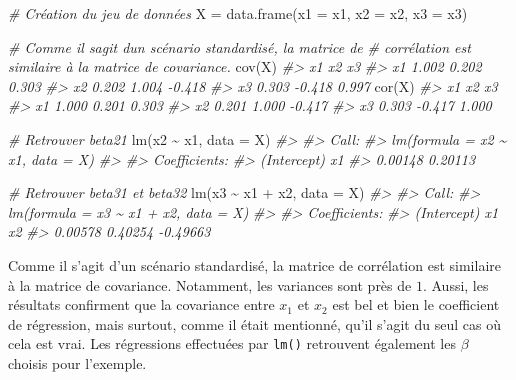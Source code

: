 \documentclass[
]{book}
\newenvironment{Shaded}{}{}
\newcommand{\AttributeTok}[1]{#1}
\newcommand{\CommentTok}[1]{\textit{#1}}
\newcommand{\FunctionTok}[1]{#1}
\newcommand{\NormalTok}[1]{#1}
\newcommand{\OtherTok}[1]{#1}
\newcommand{\SpecialCharTok}[1]{#1}
\begin{document}
\begin{Shaded}
\begin{Highlighting}[]
\CommentTok{\# Création du jeu de données}
\NormalTok{X }\OtherTok{=} \FunctionTok{data.frame}\NormalTok{(}\AttributeTok{x1 =}\NormalTok{ x1,}
               \AttributeTok{x2 =}\NormalTok{ x2,}
               \AttributeTok{x3 =}\NormalTok{ x3)}

\CommentTok{\# Comme il s\textquotesingle{}agit d\textquotesingle{}un scénario standardisé, la matrice de}
\CommentTok{\# corrélation est similaire à la matrice de covariance.}
\FunctionTok{cov}\NormalTok{(X)}
\CommentTok{\#\textgreater{}       x1     x2     x3}
\CommentTok{\#\textgreater{} x1 1.002  0.202  0.303}
\CommentTok{\#\textgreater{} x2 0.202  1.004 {-}0.418}
\CommentTok{\#\textgreater{} x3 0.303 {-}0.418  0.997}
\FunctionTok{cor}\NormalTok{(X)}
\CommentTok{\#\textgreater{}       x1     x2     x3}
\CommentTok{\#\textgreater{} x1 1.000  0.201  0.303}
\CommentTok{\#\textgreater{} x2 0.201  1.000 {-}0.417}
\CommentTok{\#\textgreater{} x3 0.303 {-}0.417  1.000}

\CommentTok{\# Retrouver beta21}
\FunctionTok{lm}\NormalTok{(x2 }\SpecialCharTok{\textasciitilde{}}\NormalTok{ x1, }\AttributeTok{data =}\NormalTok{ X)}
\CommentTok{\#\textgreater{} }
\CommentTok{\#\textgreater{} Call:}
\CommentTok{\#\textgreater{} lm(formula = x2 \textasciitilde{} x1, data = X)}
\CommentTok{\#\textgreater{} }
\CommentTok{\#\textgreater{} Coefficients:}
\CommentTok{\#\textgreater{} (Intercept)           x1  }
\CommentTok{\#\textgreater{}     0.00148      0.20113}

\CommentTok{\# Retrouver beta31 et beta32}
\FunctionTok{lm}\NormalTok{(x3 }\SpecialCharTok{\textasciitilde{}}\NormalTok{ x1 }\SpecialCharTok{+}\NormalTok{ x2, }\AttributeTok{data =}\NormalTok{ X)}
\CommentTok{\#\textgreater{} }
\CommentTok{\#\textgreater{} Call:}
\CommentTok{\#\textgreater{} lm(formula = x3 \textasciitilde{} x1 + x2, data = X)}
\CommentTok{\#\textgreater{} }
\CommentTok{\#\textgreater{} Coefficients:}
\CommentTok{\#\textgreater{} (Intercept)           x1           x2  }
\CommentTok{\#\textgreater{}     0.00578      0.40254     {-}0.49663}
\end{Highlighting}
\end{Shaded}

Comme il s'agit d'un scénario standardisé, la matrice de corrélation est similaire à la matrice de covariance. Notamment, les variances sont près de \(1\). Aussi, les résultats confirment que la covariance entre \(x_1\) et \(x_2\) est bel et bien le coefficient de régression, mais surtout, comme il était mentionné, qu'il s'agit du seul cas où cela est vrai. Les régressions effectuées par \texttt{lm()} retrouvent également les \(\beta\) choisis pour l'exemple.
\end{document}
